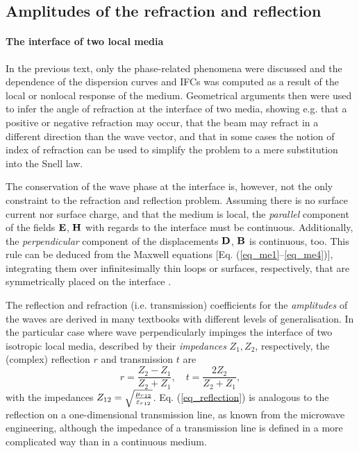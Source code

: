 
\subsection{Amplitudes of the refraction and reflection}
\paragraph{The interface of two local media} %
In the previous text, only the phase-related phenomena were discussed and the dependence of the dispersion curves and IFCs was computed as a result of the local or nonlocal response of the medium. Geometrical arguments then were used to infer the angle of refraction at the interface of two media, showing e.g. that a positive or negative refraction may occur, that the beam may refract in a different direction than the wave vector, and that in some cases the notion of index of refraction can be used to simplify the problem to a mere substitution into the Snell law.

The conservation of the wave phase at the interface is, however, not the only constraint to the refraction and reflection problem. Assuming there is no surface current nor surface charge, and that the medium is local, the \textit{parallel} component of the fields $\mathbf{E}$, $\mathbf{H}$ with regards to the interface must be continuous. Additionally, the \textit{perpendicular} component of the displacements $\mathbf{D}$, $\mathbf{B}$ is continuous, too. This rule can be deduced from the Maxwell equations [Eq.  (\ref{eq_me1}--\ref{eq_me4})], integrating them over infinitesimally thin loops or surfaces, respectively, that are symmetrically placed on the interface \cite[pp. 26-29]{klingshirn2007semiconductor}. 

The reflection and refraction (i.e. transmission) coefficients for the \textit{amplitudes} of the waves are derived in many textbooks  with different levels of generalisation.  
In the particular case where wave perpendicularly impinges the interface of two isotropic local media, described by their \textit{impedances} $Z_1, Z_2$, respectively, the (complex) reflection $r$ and transmission $t$ are
\begin{equation} r = \frac{Z_2 - Z_1}{Z_2+Z_1}, \quad t = \frac{2 Z_2}{Z_2 + Z_1}, \label{eq_reflection}\end{equation}
with the impedances
$Z_{12} = \sqrt{\frac{{\mu_r}_{12}}{{\varepsilon_r}_{12}  }  }$.
Eq. (\ref{eq_reflection}) is analogous to the reflection on a one-dimensional transmission line, as known from the microwave engineering, although the impedance of a transmission line is defined in a more complicated way than in a continuous medium.

